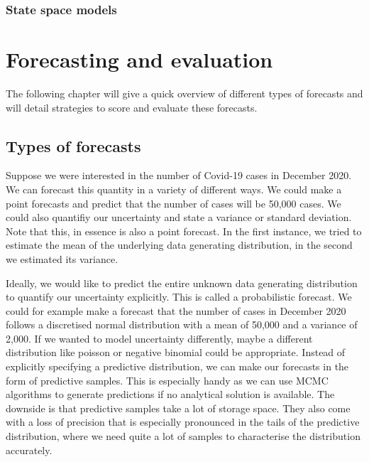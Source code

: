 \documentclass[
]{book}
\begin{document}
\hypertarget{state-space-models}{%
\subsection{State space models}\label{state-space-models}}

\hypertarget{forecasting-and-evaluation}{%
\chapter{Forecasting and evaluation}\label{forecasting-and-evaluation}}

The following chapter will give a quick overview of different types of forecasts and will detail strategies to score and evaluate these forecasts.

\hypertarget{types-of-forecasts}{%
\section{Types of forecasts}\label{types-of-forecasts}}

Suppose we were interested in the number of Covid-19 cases in December 2020. We can forecast this quantity in a variety of different ways. We could make a point forecasts and predict that the number of cases will be 50,000 cases. We could also quantifiy our uncertainty and state a variance or standard deviation. Note that this, in essence is also a point forecast. In the first instance, we tried to estimate the mean of the underlying data generating distribution, in the second we estimated its variance.

Ideally, we would like to predict the entire unknown data generating distribution to quantify our uncertainty explicitly. This is called a probabilistic forecast. We could for example make a forecast that the number of cases in December 2020 follows a discretised normal distribution with a mean of 50,000 and a variance of 2,000. If we wanted to model uncertainty differently, maybe a different distribution like poisson or negative binomial could be appropriate. Instead of explicitly specifying a predictive distribution, we can make our forecasts in the form of predictive samples. This is especially handy as we can use MCMC algorithms to generate predictions if no analytical solution is available. The downside is that predictive samples take a lot of storage space. They also come with a loss of precision that is especially pronounced in the tails of the predictive distribution, where we need quite a lot of samples to characterise the distribution accurately.
\end{document}
